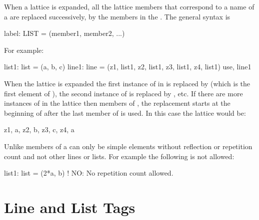 When a lattice is expanded, all the lattice members that correspond to
a name of a  are replaced successively, by the
members in the . The general syntax is
\begin{example}
  label: LIST = (member1, member2, ...)
\end{example}
For example:
\begin{example}
  list1: list = (a, b, c)
  line1: line = (z1, list1, z2, list1, z3, list1, z4, list1)
  use, line1
\end{example}
When the lattice is expanded the first instance of  in
 is replaced by  (which is the first element of
), the second instance of  is replaced by ,
etc. If there are more instances of  in the lattice then
members of , the replacement starts at the beginning of
 after the last member of  is used. In this case the
lattice would be:
\begin{example}
  z1, a, z2, b, z3, c, z4, a
\end{example}
Unlike \mad members of a  can only be simple elements 
without reflection or repetition count and not other lines or lists. 
For example the following is not allowed:
\begin{example}
  list1: list = (2*a, b)  ! NO: No repetition count allowed.
\end{example}

\section{Line and List Tags}
\label{s:tag}

